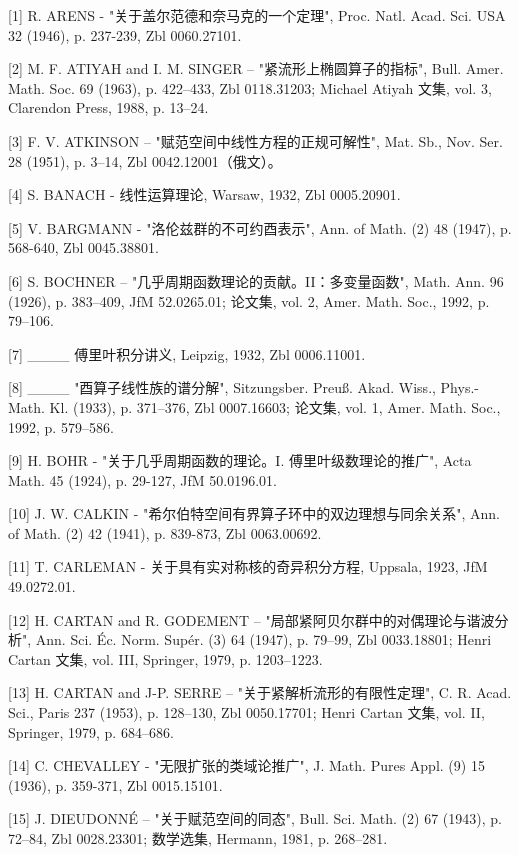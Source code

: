 
{[}1{]} R. ARENS - "关于盖尔范德和奈马克的一个定理", Proc. Natl. Acad. Sci. USA 32 (1946), p. 237-239, Zbl 0060.27101.

{[}2{]} M. F. ATIYAH and I. M. SINGER -- "紧流形上椭圆算子的指标", Bull. Amer. Math. Soc. 69 (1963), p. 422--433, Zbl 0118.31203; Michael Atiyah 文集, vol. 3, Clarendon Press, 1988, p. 13--24.

{[}3{]} F. V. ATKINSON -- "赋范空间中线性方程的正规可解性", Mat. Sb., Nov. Ser. 28 (1951), p. 3--14, Zbl 0042.12001（俄文）。

{[}4{]} S. BANACH - 线性运算理论, Warsaw, 1932, Zbl 0005.20901.

{[}5{]} V. BARGMANN - "洛伦兹群的不可约酉表示", Ann. of Math. (2) 48 (1947), p. 568-640, Zbl 0045.38801.

{[}6{]} S. BOCHNER -- "几乎周期函数理论的贡献。II：多变量函数", Math. Ann. 96 (1926), p. 383--409, JfM 52.0265.01; 论文集, vol. 2, Amer. Math. Soc., 1992, p. 79--106.

{[}7{]} \_\_\_\_ 傅里叶积分讲义, Leipzig, 1932, Zbl 0006.11001.

{[}8{]} \_\_\_\_ "酉算子线性族的谱分解", Sitzungsber. Preuß. Akad. Wiss., Phys.-Math. Kl. (1933), p. 371--376, Zbl 0007.16603; 论文集, vol. 1, Amer. Math. Soc., 1992, p. 579--586.

{[}9{]} H. BOHR - "关于几乎周期函数的理论。I. 傅里叶级数理论的推广", Acta Math. 45 (1924), p. 29-127, JfM 50.0196.01.

{[}10{]} J. W. CALKIN - "希尔伯特空间有界算子环中的双边理想与同余关系", Ann. of Math. (2) 42 (1941), p. 839-873, Zbl 0063.00692.

{[}11{]} T. CARLEMAN - 关于具有实对称核的奇异积分方程, Uppsala, 1923, JfM 49.0272.01.

{[}12{]} H. CARTAN and R. GODEMENT -- "局部紧阿贝尔群中的对偶理论与谐波分析", Ann. Sci. Éc. Norm. Supér. (3) 64 (1947), p. 79--99, Zbl 0033.18801; Henri Cartan 文集, vol. III, Springer, 1979, p. 1203--1223.

{[}13{]} H. CARTAN and J-P. SERRE -- "关于紧解析流形的有限性定理", C. R. Acad. Sci., Paris 237 (1953), p. 128--130, Zbl 0050.17701; Henri Cartan 文集, vol. II, Springer, 1979, p. 684--686.

{[}14{]} C. CHEVALLEY - "无限扩张的类域论推广", J. Math. Pures Appl. (9) 15 (1936), p. 359-371, Zbl 0015.15101.

{[}15{]} J. DIEUDONNÉ -- "关于赋范空间的同态", Bull. Sci. Math. (2) 67 (1943), p. 72--84, Zbl 0028.23301; 数学选集, Hermann, 1981, p. 268--281.

